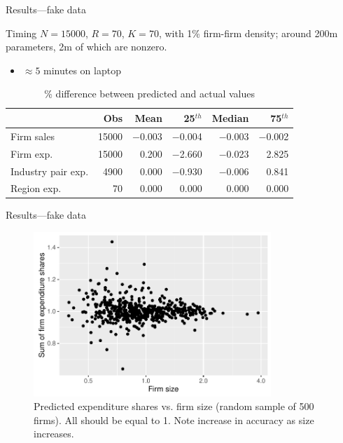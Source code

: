 \documentclass[12pt]{beamer}
\begin{document}
\begin{frame}{Results---fake data}

\begin{block}{Timing}
$N = 15000$, $R=70$, $K=70$, with 1\% firm-firm density; around 200m parameters, 2m of which are nonzero.
\begin{itemize}
\item $\approx 5$ minutes on laptop
\end{itemize}
\end{block}

\begin{table}[]
\centering
\footnotesize
\caption{\% difference between predicted and actual values}
\label{my-label}
\begin{tabular}{l rrrrr}
\toprule
                          & Obs & Mean &  25$^{th}$ & Median & 75$^{th}$ \\
\midrule                          
Firm sales                 	&	15000	&	$-$0.003	&	$-$0.004	&	$-$0.003	&	$-$0.002	                 \\
Firm exp.           	&	15000	&	0.200	&	$-$2.660	&	$-$0.023	&	2.825	                \\
Industry pair exp. 	&	4900	&	0.000	&	$-$0.930	&	$-$0.006	&	0.841	                 \\
Region exp.         	&	70	&	0.000	&	0.000	&	0.000	&	0.000	                 \\
	\bottomrule
\end{tabular}
\end{table}

\end{frame}

\begin{frame}{Results---fake data}

\begin{figure}[h]
\caption{Predicted expenditure shares vs. firm size (random sample of 500 firms). All should be equal to 1. Note increase in accuracy as size increases.}
\centering
\includegraphics[width=0.8\textwidth]{size-share-plot}
\end{figure}

\end{frame}
\end{document}
